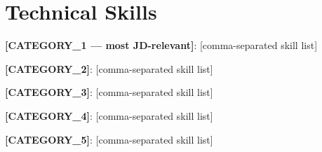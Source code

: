 \documentclass[11pt,a4paper,sans]{moderncv}
\newcommand{\projectentry}[2]{
 \vspace{-0.3em}
 \textbf{#1} \hfill #2\\[-1.0em]
}
\begin{document}
%

%
%
%
%
%
%
\section{Technical Skills}
\vspace{-0.2em}
\noindent\textbf{[CATEGORY_1 --- most JD-relevant]}: [comma-separated skill list]\par
\noindent\textbf{[CATEGORY_2]}: [comma-separated skill list]\par
\noindent\textbf{[CATEGORY_3]}: [comma-separated skill list]\par
\noindent\textbf{[CATEGORY_4]}: [comma-separated skill list]\par
\noindent\textbf{[CATEGORY_5]}: [comma-separated skill list]\par
\vspace{-0.2em}
\end{document}
